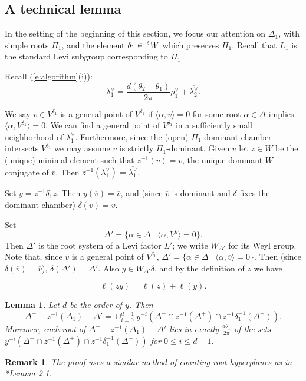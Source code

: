 \documentclass[10pt,leqno]{article}
\newtheorem{lemma}[equation]{Lemma}
\newtheorem{remark}[equation]{Remark}
{\theorembodyfont{\rmfamily}
\newtheorem{theoremplain}[equation]{Theorem}
\newtheorem{remarkplain}[equation]{Remark}
\newtheorem{editorialremarkplain}[equation]{Editorial Remark}
\newtheorem{exampleplain}[equation]{Example}
\newtheorem{corollaryplain}[equation]{Corollary}
}
\renewcommand{\a}{\mathfrak a}
\newcommand{\ch}[1]{#1^\vee}
\newcommand\inv{^{-1}}
\newcommand{\Wext}{\negthinspace\negthinspace\phantom{a}^\delta W}
\def\le{\leqslant}
\def\a{\alpha}
\def\d{\delta}
\def\th{\theta}
\def\l{\lambda}
\def\i{^{-1}}
\begin{document}

\subsection{A technical lemma}
\label{technical}

In the setting of the beginning of this section, we focus
our attention on $\Delta_1$, with simple roots $\Pi_1$,  and the element $\delta_1\in \Wext$
which preserves $\Pi_1$.
Recall that $L_1$ is the standard Levi subgroup corresponding to $\Pi_1$.

Recall (\ref{e:algorithm}(i)):
$$
\ch\l_1=\frac{d(\th_2-\th_1)}{2 \pi}
\ch\rho_1+\overline{\ch\l_2}.
$$

We say $v\in V^{\delta_1}$ is a general point of $V^{\delta_1}$ if $\langle\a, v\rangle=0$ for some
root $\a \in \Delta$ implies $\langle\a, V^{\d_1}\rangle=0$.  We can
find a general point of $V^{\delta_1}$ in a sufficiently small
neighborhood of $\ch\l_{1}$.  Furthermore, since the (open)
$\Pi_1$-dominant chamber intersects $V^{\delta_1}$ we may assume $v$
is strictly $\Pi_1$-dominant.
Given $v$ let  $z \in W$ be the (unique) minimal element such
that $z\i(v) = \overline v$, the unique dominant $W$-conjugate of $v$.
Then $z\inv(\ch\l_{1})=\overline{\ch\l_{1}}$.

Set $y=z\inv\delta_1z$.  Then $y(\overline v)=\overline v$, and
(since $\overline v$ is dominant and $\delta$ fixes the dominant
chamber) $\delta(\overline v)=\overline v$.

Set
$$
\Delta'=\{\alpha\in\Delta\mid \langle\alpha,V^y\rangle=0\}.
$$
Then $\Delta'$ is the root system of a Levi factor $L'$; we write $W_{\Delta'}$ for its Weyl group.
Note that, since $v$ is a general point of $V^{\delta_1}$,  $\Delta'=\{\alpha\in\Delta\mid \langle\alpha,\overline v\rangle=0\}$.
Then  (since $\delta(\overline v)=\overline v$), $\delta(\Delta')=\Delta'$. Also $y\in W_{\Delta'}\delta$,
and by the definition of $z$ we have

\begin{equation}
\label{e:lengthsadd}
\ell(zy)=\ell(z)+\ell(y).
\end{equation}

\begin{lemma} \label{tech}
Let $d$ be the order of $y$. Then
$$\Delta^- - z \i(\Delta_{1})-\Delta' = \cup_{i=0}^{d-1} y^{-i}(\Delta^- \cap z \i(\Delta^+) \cap z \i \d_1 \i(\Delta^-)).$$
Moreover, each root of $\Delta^- - z \i(\Delta_{1})-\Delta'$ lies in exactly $\frac{d \th_1} {2\pi}$ of the sets $y^{-i}(\Delta^- \cap z \i(\Delta^+) \cap z \i \d_1 \i(\Delta^-))$ for $0 \le i \le d-1$.
\end{lemma}
\begin{remark}
  The proof uses a similar method of counting root hyperplanes as in
  \cite{he_nie_minimal_finite}*{Lemma 2.1}.
\end{remark}
\end{document}
